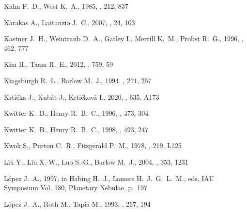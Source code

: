 \documentclass[useAMS, usenatbib]{mnras}
\begin{document}
\begin{thebibliography}{}
{Kahn} F.~D.,  {West} K.~A.,  1985, \mnras, 212, 837

{Karakas} A.,  {Lattanzio} J.~C.,  2007, \pasa, 24, 103

{Kastner} J.~H.,  {Weintraub} D.~A.,  {Gatley} I.,  {Merrill} K.~M.,   {Probst}
  R.~G.,  1996, \apj, 462, 777

{Kim} H.,  {Taam} R.~E.,  2012, \apj, 759, 59

{Kingsburgh} R.~L.,  {Barlow} M.~J.,  1994, \mnras, 271, 257

{Krti{\v{c}}ka} J.,  {Kubát} J.,   {Krti{\v{c}}ková} I.,  2020, \aap, 635,
  A173

{Kwitter} K.~B.,  {Henry} R.~B.~C.,  1996, \apj, 473, 304

{Kwitter} K.~B.,  {Henry} R.~B.~C.,  1998, \apj, 493, 247

{Kwok} S.,  {Purton} C.~R.,   {Fitzgerald} P.~M.,  1978, \apjl, 219, L125

{Liu} Y.,  {Liu} X.-W.,  {Luo} S.-G.,   {Barlow} M.~J.,  2004, \mnras, 353,
  1231

{L\'opez} J.~A.,  1997, in {Habing} H.~J.,  {Lamers} H.~J.~G.~L.~M.,  eds,  IAU
  Symposium Vol. 180, Planetary Nebulae. p.~197

{L\'opez} J.~A.,  {Roth} M.,   {Tapia} M.,  1993, \aap, 267, 194


\end{thebibliography}
\end{document}
